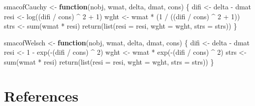\documentclass[
  12pt,
  letterpaper,
  DIV=11,
  numbers=noendperiod]{scrartcl}
\newenvironment{Shaded}{\begin{snugshade}}{\end{snugshade}}
\newcommand{\AttributeTok}[1]{\textcolor[rgb]{0.40,0.45,0.13}{#1}}
\newcommand{\ControlFlowTok}[1]{\textcolor[rgb]{0.00,0.23,0.31}{\textbf{#1}}}
\newcommand{\DecValTok}[1]{\textcolor[rgb]{0.68,0.00,0.00}{#1}}
\newcommand{\FunctionTok}[1]{\textcolor[rgb]{0.28,0.35,0.67}{#1}}
\newcommand{\NormalTok}[1]{\textcolor[rgb]{0.00,0.23,0.31}{#1}}
\newcommand{\OtherTok}[1]{\textcolor[rgb]{0.00,0.23,0.31}{#1}}
\newcommand{\SpecialCharTok}[1]{\textcolor[rgb]{0.37,0.37,0.37}{#1}}
\theoremstyle{plain}
\theoremstyle{remark}
\begin{document}
\begin{Shaded}
\begin{Highlighting}[]
\NormalTok{smacofCauchy }\OtherTok{\textless{}{-}} \ControlFlowTok{function}\NormalTok{(nobj, wmat, delta, dmat, cons) \{}
\NormalTok{  difi }\OtherTok{\textless{}{-}}\NormalTok{ delta }\SpecialCharTok{{-}}\NormalTok{ dmat}
\NormalTok{  resi }\OtherTok{\textless{}{-}} \FunctionTok{log}\NormalTok{((difi }\SpecialCharTok{/}\NormalTok{ cons) }\SpecialCharTok{\^{}} \DecValTok{2} \SpecialCharTok{+} \DecValTok{1}\NormalTok{)}
\NormalTok{  wght }\OtherTok{\textless{}{-}}\NormalTok{ wmat }\SpecialCharTok{*}\NormalTok{ (}\DecValTok{1} \SpecialCharTok{/}\NormalTok{ ((difi }\SpecialCharTok{/}\NormalTok{ cons) }\SpecialCharTok{\^{}} \DecValTok{2} \SpecialCharTok{+} \DecValTok{1}\NormalTok{))}
\NormalTok{  strs }\OtherTok{\textless{}{-}} \FunctionTok{sum}\NormalTok{(wmat }\SpecialCharTok{*}\NormalTok{ resi)}
  \FunctionTok{return}\NormalTok{(}\FunctionTok{list}\NormalTok{(}\AttributeTok{resi =}\NormalTok{ resi, }\AttributeTok{wght =}\NormalTok{ wght, }\AttributeTok{strs =}\NormalTok{ strs))}
\NormalTok{\}}

\NormalTok{smacofWelsch }\OtherTok{\textless{}{-}} \ControlFlowTok{function}\NormalTok{(nobj, wmat, delta, dmat, cons) \{}
\NormalTok{  difi }\OtherTok{\textless{}{-}}\NormalTok{ delta }\SpecialCharTok{{-}}\NormalTok{ dmat}
\NormalTok{  resi }\OtherTok{\textless{}{-}} \DecValTok{1} \SpecialCharTok{{-}} \FunctionTok{exp}\NormalTok{(}\SpecialCharTok{{-}}\NormalTok{(difi }\SpecialCharTok{/}\NormalTok{ cons) }\SpecialCharTok{\^{}} \DecValTok{2}\NormalTok{)}
\NormalTok{  wght }\OtherTok{\textless{}{-}}\NormalTok{ wmat }\SpecialCharTok{*} \FunctionTok{exp}\NormalTok{(}\SpecialCharTok{{-}}\NormalTok{(difi }\SpecialCharTok{/}\NormalTok{ cons) }\SpecialCharTok{\^{}} \DecValTok{2}\NormalTok{)}
\NormalTok{  strs }\OtherTok{\textless{}{-}} \FunctionTok{sum}\NormalTok{(wmat }\SpecialCharTok{*}\NormalTok{ resi)}
  \FunctionTok{return}\NormalTok{(}\FunctionTok{list}\NormalTok{(}\AttributeTok{resi =}\NormalTok{ resi, }\AttributeTok{wght =}\NormalTok{ wght, }\AttributeTok{strs =}\NormalTok{ strs))}
\NormalTok{\}}
\end{Highlighting}
\end{Shaded}

\section*{References}\label{references}
\end{document}
